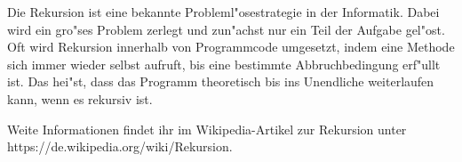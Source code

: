 Die Rekursion ist eine bekannte Probleml"osestrategie in der Informatik. Dabei wird ein gro"ses Problem zerlegt und zun"achst nur ein Teil der Aufgabe gel"ost. Oft wird Rekursion innerhalb von Programmcode umgesetzt, indem eine Methode sich immer wieder selbst aufruft, bis eine bestimmte Abbruchbedingung erf"ullt ist. Das hei"st, dass das Programm theoretisch bis ins Unendliche weiterlaufen kann, wenn es rekursiv ist. 

Weite Informationen findet ihr im Wikipedia-Artikel zur Rekursion unter https://de.wikipedia.org/wiki/Rekursion.